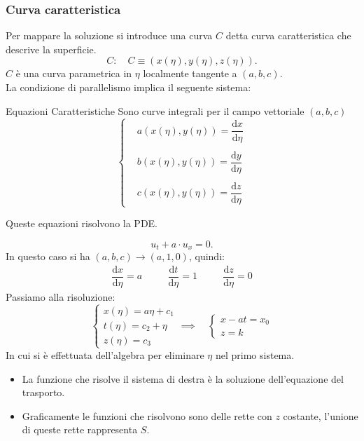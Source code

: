 \begin{appendices}
\subsubsection{Curva caratteristica}%
\label{subsub:Curva caratteristica}
Per mappare la soluzione si introduce una curva $C$ detta curva caratteristica che descrive la superficie. 
\[
    C: \quad C \equiv \left(x(\eta) , y(\eta), z(\eta) \right)
.\] 
$C$ è una curva parametrica in $\eta$ localmente tangente a $(a, b, c)$.\\
La condizione di parallelismo implica il seguente sistema:
\begin{greenbox}{Equazioni Caratteristiche}
    Sono curve integrali per il campo vettoriale $(a, b, c)$ 
\[
    \begin{cases}
	 &a(x(\eta) , y(\eta) ) = \dfrac{\text{d} x}{\text{d} \eta} \\
								   &\\
	 &b(x(\eta) , y(\eta) ) = \dfrac{\text{d} y}{\text{d} \eta} \\ 
								   &\\
	 &c(x(\eta) , y(\eta) ) = \dfrac{\text{d} z}{\text{d} \eta}  
    \end{cases}
\]
\end{greenbox}
\noindent
Queste equazioni risolvono la PDE.
\begin{exmp}
   \[
       u_t + a \cdot u_x = 0
   .\]  
   In questo caso si ha $(a, b, c) \to (a, 1, 0)$, quindi:
   \[\begin{aligned}
	   &\dfrac{\text{d} x}{\text{d} \eta} = a & \quad
	   &\dfrac{\text{d} t}{\text{d} \eta} = 1 & \quad
	   &\dfrac{\text{d} z}{\text{d} \eta} = 0 &
   \end{aligned}\]
   Passiamo alla risoluzione:
   \[
       \begin{cases}
	    x(\eta) = a\eta +c_1\\
	    t(\eta) = c_2 + \eta\\
	    z(\eta) = c_3
       \end{cases}
       \implies\quad
       \begin{cases}
           x -at = x_0\\
	   z=k
       \end{cases}
   \] 
   In cui si è effettuata dell'algebra per eliminare $\eta$ nel primo sistema. 
   \begin{itemize}
       \item La funzione che risolve il sistema di destra è la soluzione dell'equazione del trasporto. 
       \item  Graficamente le funzioni che risolvono sono delle rette con $z$ costante, l'unione di queste rette rappresenta $S$.

\end{itemize}
\end{exmp}
\end{appendices}
